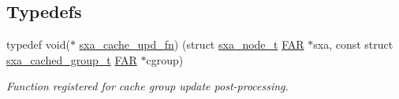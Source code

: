 \subsection*{Typedefs}
\begin{DoxyCompactItemize}
\item 
typedef void($\ast$ \hyperlink{group___s_x_a_gaaeb2977fc8c351b3edcf007c1effc374}{sxa\+\_\+cache\+\_\+upd\+\_\+fn}) (struct \hyperlink{structsxa__node__t}{sxa\+\_\+node\+\_\+t} \hyperlink{group__hal_gaef060b3456fdcc093a7210a762d5f2ed}{F\+AR} $\ast$sxa, const struct \hyperlink{structsxa__cached__group__t}{sxa\+\_\+cached\+\_\+group\+\_\+t} \hyperlink{group__hal_gaef060b3456fdcc093a7210a762d5f2ed}{F\+AR} $\ast$cgroup)
\begin{DoxyCompactList}\small\item\em Function registered for cache group update post-\/processing. \end{DoxyCompactList}\end{DoxyCompactItemize}
